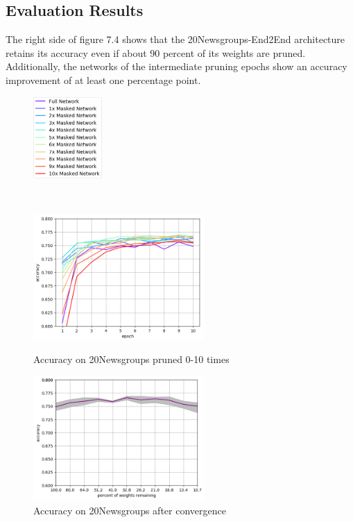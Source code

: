 \subsection*{Evaluation Results}
The right side of figure 7.4 shows that the 20Newsgroups-End2End architecture retains its accuracy even if about 90 percent of its weights are pruned. Additionally, the networks of the intermediate pruning epochs show an accuracy improvement of at least one percentage point.
\begin{figure}
	\begin{minipage}{0.5\textwidth}
		\centering
		\includegraphics[width=100px]{gfx/7-Evaluation/20Newsgroups_legend.png}
	\end{minipage}
	\begin{minipage}{0.5\textwidth}
		\centering
	\end{minipage}
	\\
	\begin{minipage}{0.5\textwidth}
		\centering
		\includegraphics[height=180px]{gfx/Experiments/Transfer-20Newsgroups-CNN/accuracy/10_iterations.png}
		\caption*{Accuracy on 20Newsgroups pruned 0-10 times}
		\label{fig:CIFAR10accuracy15}
	\end{minipage}\hfill
	\begin{minipage}{0.5\textwidth}
		\centering
		\includegraphics[height=180px]{gfx/Experiments/Transfer-20Newsgroups-CNN/accuracy/converged.png}
		\caption*{Accuracy on 20Newsgroups after convergence}
		\label{?}
	\end{minipage}
\end{figure}

